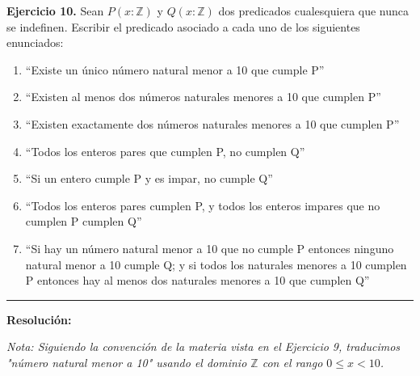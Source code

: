 \hypertarget{ej10}{}
\noindent \textbf{Ejercicio 10.} Sean $P(x:\mathbb{Z})$ y $Q(x:\mathbb{Z})$ dos predicados cualesquiera que nunca se indefinen. Escribir el predicado asociado a cada uno de los siguientes enunciados:

\begin{enumerate}[label=\alph*)]
    \item “Existe un único número natural menor a 10 que cumple P”
    \item “Existen al menos dos números naturales menores a 10 que cumplen P”
    \item “Existen exactamente dos números naturales menores a 10 que cumplen P”
    \item “Todos los enteros pares que cumplen P, no cumplen Q”
    \item “Si un entero cumple P y es impar, no cumple Q”
    \item “Todos los enteros pares cumplen P, y todos los enteros impares que no cumplen P cumplen Q”
    \item “Si hay un número natural menor a 10 que no cumple P entonces ninguno natural menor a 10 cumple Q; y si todos los naturales menores a 10 cumplen P entonces hay al menos dos naturales menores a 10 que cumplen Q”
\end{enumerate}

\vspace{0.2cm}
{\color{gray}\hrule}
\vspace{0.4cm}

\textbf{Resolución:}

\textit{Nota: Siguiendo la convención de la materia vista en el Ejercicio 9, traducimos "número natural menor a 10" usando el dominio $\mathbb{Z}$ con el rango $0 \leq x < 10$.}

